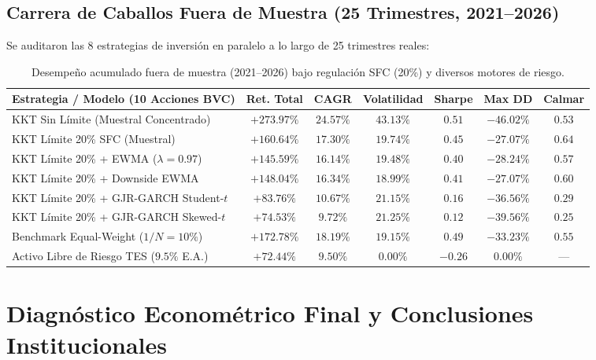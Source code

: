\documentclass[11pt,a4paper]{article}
\begin{document}
\subsection{Carrera de Caballos Fuera de Muestra (25 Trimestres, 2021--2026)}
Se auditaron las 8 estrategias de inversión en paralelo a lo largo de 25 trimestres reales:

\begin{table}[htbp]
\centering
\footnotesize
\setlength{\tabcolsep}{3pt}
\begin{tabularx}{\textwidth}{Xcccccc}
\toprule
Estrategia / Modelo (10 Acciones BVC) & Ret. Total & CAGR & Volatilidad & Sharpe & Max DD & Calmar \\
\midrule
KKT Sin Límite (Muestral Concentrado) & $+273.97\%$ & $24.57\%$ & $43.13\%$ & $0.51$ & $-46.02\%$ & $0.53$ \\
KKT Límite 20\% SFC (Muestral) & $+160.64\%$ & $17.30\%$ & $19.74\%$ & $0.45$ & $-27.07\%$ & $0.64$ \\
KKT Límite 20\% + EWMA ($\lambda=0.97$) & $+145.59\%$ & $16.14\%$ & $19.48\%$ & $0.40$ & $-28.24\%$ & $0.57$ \\
KKT Límite 20\% + Downside EWMA & $+148.04\%$ & $16.34\%$ & $18.99\%$ & $0.41$ & $-27.07\%$ & $0.60$ \\
KKT Límite 20\% + GJR-GARCH Student-$t$ & $+83.76\%$ & $10.67\%$ & $21.15\%$ & $0.16$ & $-36.56\%$ & $0.29$ \\
KKT Límite 20\% + GJR-GARCH Skewed-$t$ & $+74.53\%$ & $9.72\%$ & $21.25\%$ & $0.12$ & $-39.56\%$ & $0.25$ \\
\midrule
Benchmark Equal-Weight ($1/N = 10\%$) & $+172.78\%$ & $18.19\%$ & $19.15\%$ & $0.49$ & $-33.23\%$ & $0.55$ \\
Activo Libre de Riesgo TES ($9.5\%$ E.A.) & $+72.44\%$ & $9.50\%$ & $0.00\%$ & $-0.26$ & $0.00\%$ & --- \\
\bottomrule
\end{tabularx}
\caption{Desempeño acumulado fuera de muestra (2021--2026) bajo regulación SFC (20\%) y diversos motores de riesgo.}
\end{table}

\section{Diagnóstico Econométrico Final y Conclusiones Institucionales}
\end{document}
